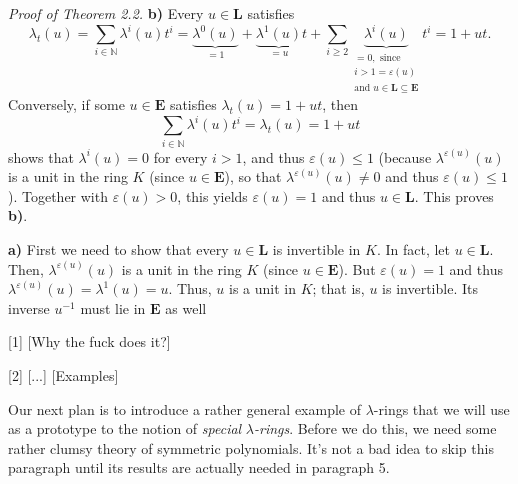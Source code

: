 \documentclass[12pt,final,notitlepage,onecolumn,german]{article}%
\begin{document}
\textit{Proof of Theorem 2.2.} \textbf{b)} Every $u\in\mathbf{L}$ satisfies%
\[
\lambda_{t}\left(  u\right)  =\sum\limits_{i\in\mathbb{N}}\lambda^{i}\left(
u\right)  t^{i}=\underbrace{\lambda^{0}\left(  u\right)  }_{=1}+\underbrace
{\lambda^{1}\left(  u\right)  }_{=u}t+\sum\limits_{i\geq2}\underbrace
{\lambda^{i}\left(  u\right)  }_{\substack{=0,\text{ since}\\i>1=\varepsilon
\left(  u\right)  \\\text{and }u\in\mathbf{L}\subseteq\mathbf{E}}}t^{i}=1+ut.
\]
Conversely, if some $u\in\mathbf{E}$ satisfies $\lambda_{t}\left(  u\right)
=1+ut$, then%
\[
\sum\limits_{i\in\mathbb{N}}\lambda^{i}\left(  u\right)  t^{i}=\lambda
_{t}\left(  u\right)  =1+ut
\]
shows that $\lambda^{i}\left(  u\right)  =0$ for every $i>1$, and thus
$\varepsilon\left(  u\right)  \leq1$ (because $\lambda^{\varepsilon\left(
u\right)  }\left(  u\right)  $ is a unit in the ring $K$ (since $u\in
\mathbf{E}$), so that $\lambda^{\varepsilon\left(  u\right)  }\left(
u\right)  \neq0$ and thus $\varepsilon\left(  u\right)  \leq1$). Together with
$\varepsilon\left(  u\right)  >0$, this yields $\varepsilon\left(  u\right)
=1$ and thus $u\in\mathbf{L}$. This proves \textbf{b)}.

\textbf{a)} First we need to show that every $u\in\mathbf{L}$ is invertible in
$K$. In fact, let $u\in\mathbf{L}$. Then, $\lambda^{\varepsilon\left(
u\right)  }\left(  u\right)  $ is a unit in the ring $K$ (since $u\in
\mathbf{E}$). But $\varepsilon\left(  u\right)  =1$ and thus $\lambda
^{\varepsilon\left(  u\right)  }\left(  u\right)  =\lambda^{1}\left(
u\right)  =u$. Thus, $u$ is a unit in $K$; that is, $u$ is invertible. Its
inverse $u^{-1}$ must lie in $\mathbf{E}$ as well

[1] [Why the fuck does it?]

\begin{center}
\end{center}

[2] [...] [Examples]

\begin{center}
\end{center}

Our next plan is to introduce a rather general example of $\lambda$-rings that
we will use as a prototype to the notion of \textit{special }$\lambda
$\textit{-rings}. Before we do this, we need some rather clumsy theory of
symmetric polynomials. It's not a bad idea to skip this paragraph until its
results are actually needed in paragraph 5.
\end{document}
